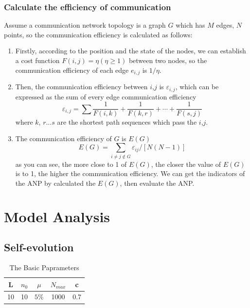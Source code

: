 \documentclass{article}
\begin{document}
\subsubsection{Calculate the efficiency of communication}
Assume a communication network topology is a graph $G$ which has $M$ edges, $N$ points, so the communication efficiency
is calculated as follows:
\begin{enumerate}
    \item Firstly,  according to the position and the state of the nodes, we can establish a cost function \(F(i,j)=\eta (\eta \ge1)\)
    between two nodes, so the communication efficiency of each edge \(e_{i,j}\) is \(1/\eta\).
    \item Then, the communication efficiency between $i$,$j$ is \(\varepsilon_{i,j}\), which can be expressed as the
    sum of every edge communication efficiency
    \begin{displaymath}
    \varepsilon_{i,j}=\sum\frac{1}{F(i,k)}+\frac{1}{F(k,r)}+\cdots+\frac{1}{F(s,j)}
    \end{displaymath}
    where $k$, $r$...$s$ are the shortest path sequences which pass the $i$,$j$.
    \item The communication efficiency of $G$ is $E(G)$
    \begin{displaymath}
    E(G)=\sum_{i\ne j\notin G}\varepsilon_{ij}/[N(N-1)]
    \end{displaymath}
    as you can see, the more close to 1 of $E(G)$, the closer the value of $E(G)$ is to 1, the higher the communication efficiency.
    We can get the indicators of the ANP by calculated the $E(G)$, then evaluate the ANP.
\end{enumerate}

\section{Model Analysis}
\subsection{Self-evolution}
\renewcommand\arraystretch{1.2}
\begin{table}%
  \centering
  \caption{The Basic Paprameters}\label{tab:tab1}
  \begin{tabular}{ccccc}
  \hline
  L & $n_0$ & $\mu$ & $N_{max}$ & c \\
  \hline
  10 & 10 & $5\%$ & 1000 & 0.7 \\
  \hline
\end{tabular}

\end{table}
\end{document}
